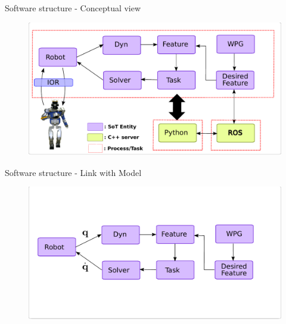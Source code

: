 \begin{frame}{Software structure - Conceptual view}
  \begin{figure}
    \includegraphics[width=\linewidth]{./figures/Concept-Fig}
  \end{figure}
\end{frame}

\begin{frame}{Software structure - Link with Model}
  \begin{figure}
    \includegraphics[width=\linewidth]{./figures/Concept-Theory-Fig-Finalv2M5}
  \end{figure}
\end{frame}

    
 


